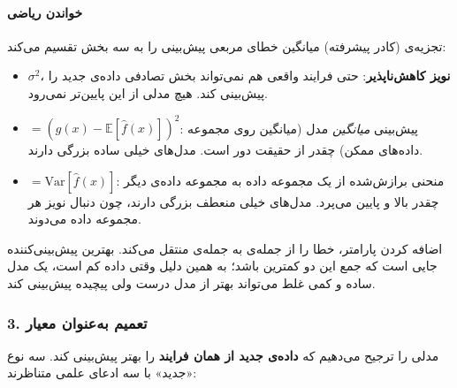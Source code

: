 \paragraph{خواندن ریاضی}

تجزیه‌ی  (کادر پیشرفته) میانگین خطای مربعی پیش‌بینی را
به سه بخش تقسیم می‌کند:

\begin{itemize}
\tightlist
\item
  \(\sigma^2\)، \textbf{نویز کاهش‌ناپذیر}: حتی فرایند واقعی هم نمی‌تواند
  بخش تصادفی داده‌ی جدید را پیش‌بینی کند. هیچ مدلی از این پایین‌تر نمی‌رود.
\item
  \textbf{} \(= (g(x) - \mathbb{E}[\hat f(x)])^2\): پیش‌بینی
  \emph{میانگین} مدل (میانگین روی مجموعه داده‌های ممکن) چقدر از حقیقت دور
  است. مدل‌های خیلی ساده  بزرگی دارند.
\item
  \textbf{} \(= \mathrm{Var}[\hat f(x)]\): منحنی برازش‌شده
  از یک مجموعه داده به مجموعه داده‌ی دیگر چقدر بالا و پایین می‌پرد. مدل‌های
  خیلی منعطف  بزرگی دارند، چون دنبال نویز هر مجموعه داده
  می‌دوند.
\end{itemize}

اضافه کردن پارامتر، خطا را از جمله‌ی  به جمله‌ی 
منتقل می‌کند. بهترین پیش‌بینی‌کننده جایی است که جمع این دو کمترین باشد؛ به
همین دلیل وقتی داده کم است، یک مدل ساده و کمی غلط می‌تواند بهتر از مدل
درست ولی پیچیده پیش‌بینی کند.

\subsubsection{3. تعمیم به‌عنوان معیار}

مدلی را ترجیح می‌دهیم که \textbf{داده‌ی جدید از همان فرایند} را بهتر
پیش‌بینی کند. سه نوع «جدید» با سه ادعای علمی متناظرند:

